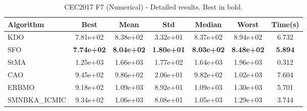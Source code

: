 \begin{table}[H]
\centering\small
\caption{CEC2017 F7 (Numerical) - Detailed results. Best in bold.}
\label{tab:cec2017_F7}
\begin{tabular}{lcccccc}
\toprule
\textbf{Algorithm} & \textbf{Best} & \textbf{Mean} & \textbf{Std} & \textbf{Median} & \textbf{Worst} & \textbf{Time(s)} \\
\midrule
KDO & 7.81e+02 & 8.38e+02 & 3.32e+01 & 8.37e+02 & 8.94e+02 & 6.732 \\
SFO & \textbf{7.74e+02} & \textbf{8.04e+02} & \textbf{1.80e+01} & \textbf{8.03e+02} & \textbf{8.48e+02} & \textbf{5.894} \\
StMA & 1.25e+03 & 1.66e+03 & 1.77e+02 & 1.64e+03 & 1.96e+03 & 0.312 \\
CAO & 9.45e+02 & 9.86e+02 & 2.06e+01 & 9.82e+02 & 1.02e+03 & 7.604 \\
ERBMO & 9.18e+02 & 1.09e+03 & 8.92e+01 & 1.09e+03 & 1.30e+03 & 5.701 \\
SMNBKA_ICMIC & 9.34e+02 & 1.06e+03 & 8.08e+01 & 1.05e+03 & 1.29e+03 & 3.744 \\
\bottomrule
\end{tabular}
\end{table}
